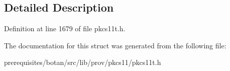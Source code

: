 \subsection{Detailed Description}


Definition at line 1679 of file pkcs11t.\+h.



The documentation for this struct was generated from the following file\+:\begin{DoxyCompactItemize}
\item 
prerequisites/botan/src/lib/prov/pkcs11/pkcs11t.\+h\end{DoxyCompactItemize}

